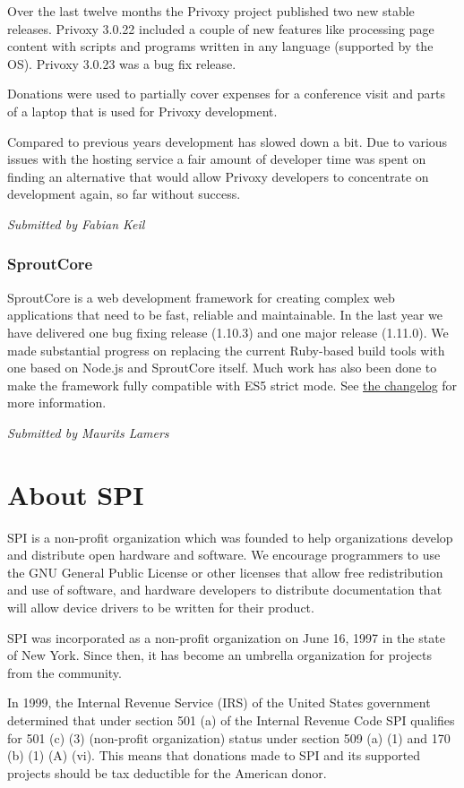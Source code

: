 \documentclass[letterpaper]{report}
\begin{document}
Over the last twelve months the Privoxy project published two new stable
releases. Privoxy 3.0.22 included a couple of new features like processing
page content with scripts and programs written in any language (supported
by the OS).  Privoxy 3.0.23 was a bug fix release.

Donations were used to partially cover expenses for a conference visit and
parts of a laptop that is used for Privoxy development.

Compared to previous years development has slowed down a bit.  Due to
various issues with the hosting service a fair amount of developer time was
spent on finding an alternative that would allow Privoxy developers to
concentrate on development again, so far without success.

{\em Submitted by Fabian Keil}

\subsection{SproutCore}

SproutCore is a web development framework for creating complex web
applications that need to be fast, reliable and maintainable.  In the last
year we have delivered one bug fixing release (1.10.3) and one major
release (1.11.0).  We made substantial progress on replacing the current
Ruby-based build tools with one based on Node.js and SproutCore itself.
Much work has also been done to make the framework fully compatible with
ES5 strict mode.  See
\href{https://github.com/sproutcore/sproutcore/blob/master/CHANGELOG.md}{the
changelog} for more information.

{\em Submitted by Maurits Lamers}


\appendix
\chapter{About SPI}

SPI is a non-profit organization which was founded to help organizations
develop and distribute open hardware and software. We encourage programmers
to use the GNU General Public License or other licenses that allow free
redistribution and use of software, and hardware developers to distribute
documentation that will allow device drivers to be written for their product.

SPI was incorporated as a non-profit organization on June 16, 1997 in the state
of New York. Since then, it has become an umbrella organization for projects
from the community.

In 1999, the Internal Revenue Service (IRS) of the United States government
determined that under section 501 (a) of the Internal Revenue Code SPI
qualifies for 501 (c) (3) (non-profit organization) status under section 509
(a) (1) and 170 (b) (1) (A) (vi). This means that donations made to SPI and its
supported projects should be tax deductible for the American donor.
\end{document}
